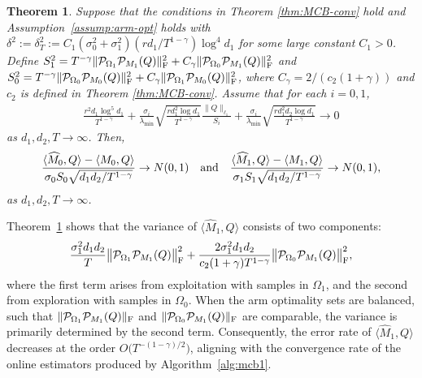 \documentclass[12pt]{article}
\newcommand\fro[1]{\| #1 \|_{\rm{F}}}
\def\calP{{\mathcal P}}
\def\hat{\widehat}
\newtheorem{Theorem}{Theorem}
\theoremstyle{plain}
\begin{document}
\begin{Theorem}\label{thm:CLT}
Suppose that the conditions in Theorem \ref{thm:MCB-conv} hold and Assumption~\ref{assump:arm-opt} holds with $\delta^2:=\delta_T^2:=C_1(\sigma_0^2+\sigma_1^2)(rd_1/T^{1-\gamma})\log^4d_1$ for some large constant $C_1>0$. Define $S_1^2=T^{-\gamma}\fro{\calP_{\Omega_1}\calP_{M_1}(Q)}^2+C_{\gamma}\fro{\calP_{\Omega_0}\calP_{M_1}(Q)}^2$ and $S_0^2=T^{-\gamma}\fro{\calP_{\Omega_0}\calP_{M_0}(Q)}^2+C_{\gamma}\fro{\calP_{\Omega_1}\calP_{M_0}(Q)}^2$, where $C_{\gamma}=2/(c_2(1+\gamma))$ and $c_2$ is defined in Theorem \ref{thm:MCB-conv}. Assume that for each $i=0,1$, 
\begin{align}\label{eq:CLT-cond}
\frac{r^2d_1\log^5d_1}{T^{1-\gamma}} + \frac{\sigma_i}{\lambda_{\min}}\sqrt{\frac{rd_1^2\log d_1}{T^{1-\gamma}}} \frac{\|Q\|_{\ell_1}}{S_i} + \frac{\sigma_i}{\lambda_{\min}}\sqrt{\frac{rd_1^2d_2\log d_1}{T^{1-\gamma}}} \rightarrow 0
\end{align}
as $d_1, d_2, T\to\infty$. Then, 
\begin{align}\label{eq:CLT}
    \frac{\langle \hat M_0, Q\rangle - \langle M_0, Q\rangle}{\sigma_0S_0 \sqrt{d_1d_2/T^{1-\gamma}}}\rightarrow N(0,1)\quad {\rm and}\quad 
    \frac{\langle \hat M_1, Q\rangle - \langle M_1, Q\rangle}{\sigma_1S_1 \sqrt{d_1d_2/T^{1-\gamma}}}\rightarrow N(0,1),
\end{align}
as $d_1,d_2, T\to\infty$. 
\end{Theorem}

Theorem~\ref{thm:CLT} shows that the variance of $\langle \hat M_1, Q\rangle$ consists of two components:
\begin{equation}\label{eq:var-two-terms}
\frac{\sigma_1^2d_1d_2}{T}\big\|\calP_{\Omega_1}\calP_{M_1}(Q)\big\|_{\rm F}^2+\frac{2\sigma_1^2d_1d_2}{c_2(1+\gamma)T^{1-\gamma}}\big\|\calP_{\Omega_0}\calP_{M_1}(Q)\big\|_{\rm F}^2,
\end{equation}
where the first term arises from exploitation with samples in $\Omega_1$, and the second from exploration with samples in $\Omega_0$. When the arm optimality sets are balanced, such that $\|\calP_{\Omega_1}\calP_{M_1}(Q)\|_{\rm F}$ and $\|\calP_{\Omega_0}\calP_{M_1}(Q)\|_{\rm F}$ are comparable, the variance is primarily determined by the second term. Consequently, the error rate of $\langle \hat M_1, Q\rangle$ decreases at the order $O\big(T^{-(1-\gamma)/2}\big)$, aligning with the convergence rate of the online estimators produced by Algorithm~\ref{alg:mcb1}.

  
\end{document}

